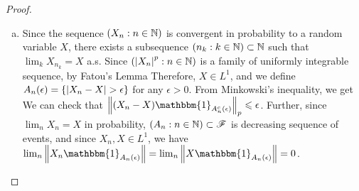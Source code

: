 \documentclass[letterpaper,10pt,english]{article}
\begin{document}
{\begin{proof}
\begin{enumerate}[(a)]
{}
The convergence in probability follows from the Markov inequality, i.e.
\item[$(c)\implies (a):$] 
Since the sequence $(X_n: n\in \mathbb{N})$ is convergent in probability to a random variable $X$, there exists a subsequence $(n_k: k \in \mathbb{N}) \subset \mathbb{N}$ such that $\lim_kX_{n_k} = X$ a.s. 
Since $(\left\lvert X_n\right\rvert^p: n \in \mathbb{N})$ is a family of uniformly integrable sequence, by Fatou's Lemma
Therefore, $X \in L^1$, and we define $A_n(\epsilon) = \left\{\left\lvert X_n-X\right\rvert > \epsilon\right\}$ for any $\epsilon > 0$. 
From Minkowski's inequality, we get 
We can check that $\norm{(X_n-X)\mathbbm{1}_{A_n^c(\epsilon)}}_p \le \epsilon$. 
Further, since $\lim_nX_n = X$ in probability, $(A_n: n \in \mathbb{N}) \subset \mathscr{F}$ is decreasing sequence of events, 
and since $X_n, X \in L^1$, we have $\lim_n\norm{X_n\mathbbm{1}_{A_n(\epsilon)}} = \lim_n\norm{X\mathbbm{1}_{A_n(\epsilon)}} = 0$.
\end{enumerate}
\end{proof}
}
\end{document}
